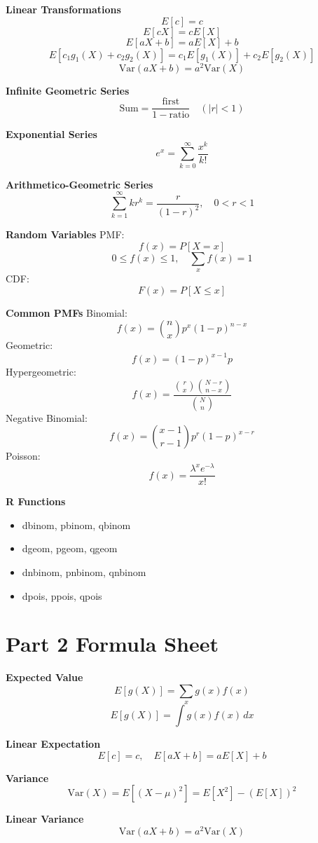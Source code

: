 \documentclass[11pt,letterpaper]{article}
\theoremstyle{remark}
\begin{document}
\textbf{Linear Transformations}
\[
E[c] = c \tag{10a}
\]
\[
E[cX] = cE[X] \tag{10b}
\]
\[
E[aX+b] = aE[X] + b \tag{10c}
\]
\[
E[c_1g_1(X) + c_2g_2(X)] = c_1E[g_1(X)] + c_2E[g_2(X)] \tag{10d}
\]
\[
\mathrm{Var}(aX+b) = a^2 \mathrm{Var}(X) \tag{10e}
\]

\textbf{Infinite Geometric Series}
\[
\text{Sum} = \frac{\text{first}}{1 - \text{ratio}} \quad (|r| < 1) \tag{11}
\]

\textbf{Exponential Series}
\[
e^x = \sum_{k=0}^\infty \frac{x^k}{k!} \tag{12}
\]

\textbf{Arithmetico-Geometric Series}
\[
\sum_{k=1}^\infty k r^k = \frac{r}{(1-r)^2}, \quad 0<r<1 \tag{13}
\]

\textbf{Random Variables}
PMF:
\[
f(x)=P[X=x] \tag{14a}
\]
\[
0 \le f(x)\le 1, \quad \sum_x f(x)=1 \tag{14b, 14c}
\]
CDF:
\[
F(x)=P[X\le x] \tag{14d}
\]

\textbf{Common PMFs}
Binomial:
\[
f(x)=\binom{n}{x}p^x(1-p)^{n-x}
\]
Geometric:
\[
f(x)=(1-p)^{x-1}p
\]
Hypergeometric:
\[
f(x)=\frac{\binom{r}{x}\binom{N-r}{n-x}}{\binom{N}{n}}
\]
Negative Binomial:
\[
f(x)=\binom{x-1}{r-1}p^r(1-p)^{x-r}
\]
Poisson:
\[
f(x)=\frac{\lambda^x e^{-\lambda}}{x!}
\]

\textbf{R Functions}
\begin{itemize}
\item dbinom, pbinom, qbinom
\item dgeom, pgeom, qgeom
\item dnbinom, pnbinom, qnbinom
\item dpois, ppois, qpois
\end{itemize}


\section*{Part 2 Formula Sheet}

\textbf{Expected Value}
\[
E[g(X)] = \sum_x g(x)f(x) \tag{1a}
\]
\[
E[g(X)] = \int g(x) f(x)\, dx \tag{1b}
\]

\textbf{Linear Expectation}
\[
E[c]=c, \quad E[aX+b]=aE[X]+b \tag{2}
\]

\textbf{Variance}
\[
\mathrm{Var}(X)=E[(X-\mu)^2]=E[X^2]-(E[X])^2 \tag{3}
\]

\textbf{Linear Variance}
\[
\mathrm{Var}(aX+b)=a^2\mathrm{Var}(X) \tag{4}
\]
\end{document}
